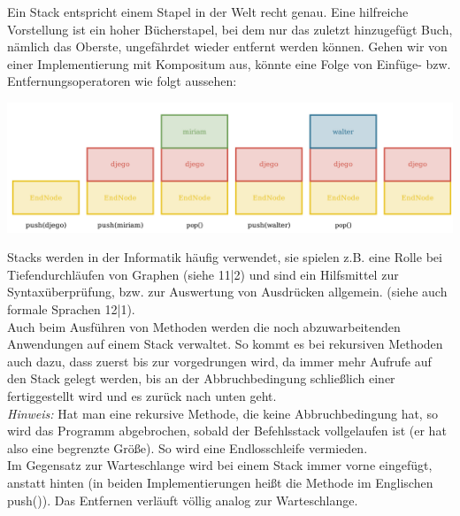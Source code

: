 \documentclass{article}
\begin{document}
Ein Stack entspricht einem Stapel in der  Welt recht genau. Eine hilfreiche Vorstellung ist ein hoher Bücherstapel, bei dem nur das zuletzt hinzugefügt Buch, nämlich das Oberste, ungefährdet wieder entfernt werden können. Gehen wir von einer Implementierung mit Kompositum aus, könnte eine Folge von Einfüge- bzw. Entfernungsoperatoren wie folgt aussehen: 
\begin{center}
    \includegraphics[scale=0.25]{../media/stack.png}
\end{center}
Stacks werden in der Informatik häufig verwendet, sie spielen z.B. eine Rolle bei Tiefendurchläufen von Graphen (siehe 11|2) und sind ein Hilfsmittel zur Syntaxüberprüfung, bzw. zur Auswertung von Ausdrücken allgemein. (siehe auch formale Sprachen 12|1). \\
Auch beim Ausführen von Methoden werden die noch abzuwarbeitenden Anwendungen auf einem Stack verwaltet. So kommt es bei rekursiven Methoden auch dazu, dass zuerst bis zur  vorgedrungen wird, da immer mehr Aufrufe auf den Stack gelegt werden, bis an der Abbruchbedingung schließlich einer fertiggestellt wird und es zurück nach unten geht. \\
\textit{Hinweis:} Hat man eine rekursive Methode, die keine Abbruchbedingung hat, so wird das Programm abgebrochen, sobald der Befehlsstack vollgelaufen ist (er hat also eine begrenzte Größe). So wird eine Endlosschleife vermieden. \\
Im Gegensatz zur Warteschlange wird bei einem Stack immer vorne eingefügt, anstatt hinten (in beiden Implementierungen heißt die Methode im Englischen push()). Das Entfernen verläuft völlig analog zur Warteschlange.
\end{document}
